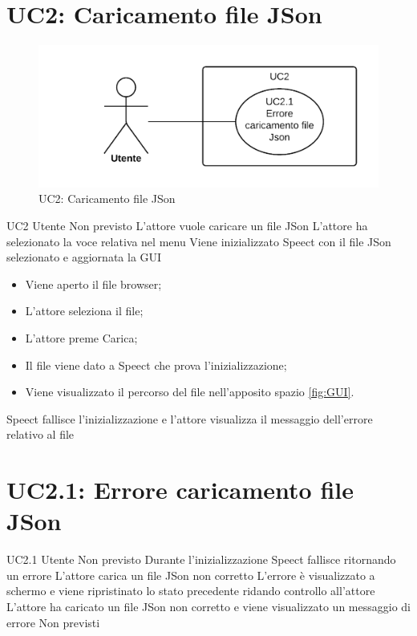 \documentclass[../AnalisideiRequisiti.tex]{subfiles}
\begin{document}
	\section{UC2: Caricamento file JSon}
	\begin{figure}[H]
		\centering
		\includegraphics[width=\textwidth]{../img/UC2.png}
		\caption{UC2: Caricamento file JSon}
	\end{figure}
	\UserCase
	{UC2}
	{Utente}
	{Non previsto}
	{L'attore vuole caricare un file JSon}
	{L'attore ha selezionato la voce relativa nel menu }
	{Viene inizializzato Speect con il file JSon selezionato e aggiornata la GUI}
	{
		\begin{itemize}
			\item{} Viene aperto il file browser;
			\item{} L'attore seleziona il file;
			\item{} L'attore preme Carica;
			\item{} Il file viene dato a Speect che prova l'inizializzazione;
			\item{} Viene visualizzato il percorso del file nell'apposito spazio \ref{fig:GUI}.
		\end{itemize}
	}
	{Speect fallisce l'inizializzazione e l'attore visualizza il messaggio dell'errore relativo al file }
	
	\section{UC2.1: Errore caricamento file JSon}
	\UserCase
	{UC2.1}
	{Utente}
	{Non previsto}
	{Durante l'inizializzazione Speect fallisce ritornando un errore}
	{L'attore carica un file JSon non corretto}
	{L'errore è visualizzato a schermo e viene ripristinato lo stato precedente ridando controllo all'attore}
	{L'attore ha caricato un file JSon non corretto e viene visualizzato un messaggio di errore}
	{Non previsti}
\end{document}
